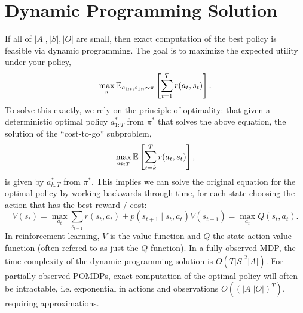 \documentclass[11pt]{article}
\begin{document}
\section{Dynamic Programming Solution}
If all of $|A|,|S|,|O|$ are small, then exact computation of the best policy
is feasible via dynamic programming.
The goal is to maximize the expected utility under your policy,
\begin{equation}
    \max_\pi \mathbb{E}_{a_{1:t},s_{1:t}\sim\pi}\left[\sum_{t=1}^T r(a_t, s_t)\right].
\end{equation}
To solve this exactly, we rely on the principle of optimality:
that given a deterministic optimal policy $a^*_{1:T}$ from $\pi^*$ that solves the
above equation, the solution of the ``cost-to-go'' subproblem,
\begin{equation}
    \max_{a_{k:T}} \mathbb{E}\left[\sum_{t=k}^T r(a_t, s_t)\right],
\end{equation}
is given by $a^*_{k:T}$ from $\pi^*$.
This implies we can solve the original equation for the optimal policy by working backwards
through time, for each state choosing the action that has the best reward / cost:
\begin{equation}
    V(s_t) = \max_{a_t} \sum_{s_{t+1}}r(s_t, a_t) + p(s_{t+1} \mid s_t, a_t)V(s_{t+1})
    = \max_{a_t} Q(s_t, a_t).
\end{equation}
In reinforcement learning, $V$ is the value function and $Q$ the state action value function
(often refered to as just the $Q$ function).
In a fully observed MDP, the time complexity of the dynamic programming solution is $O(T|S|^2|A|)$.
For partially observed POMDPs, exact computation of the optimal policy will often be
intractable, i.e. exponential in actions and observations $O((|A||O|)^T)$,
requiring approximations.
\end{document}
